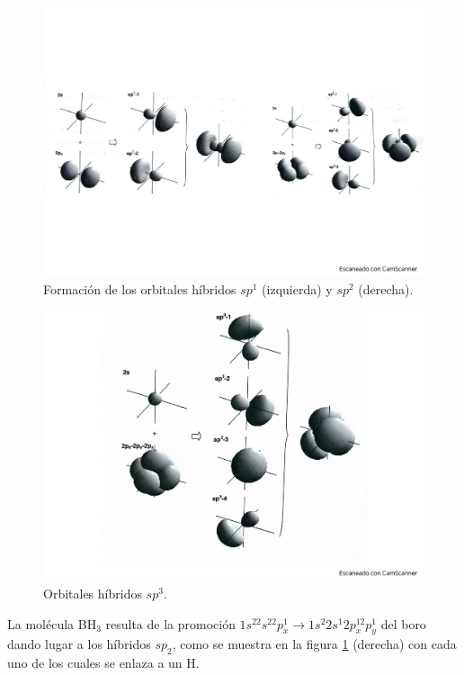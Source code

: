\begin{figure}[h!] \centering
    \includegraphics[scale=0.4]{Cuerpo/Ch_03/Fotos libro 6.pdf}
    \caption{Formación de los orbitales híbridos $sp^1$ (izquierda) y $sp^2$ (derecha).}
    \label{Fig:03-07}
\end{figure}    

\begin{figure}[h!] \centering
    \includegraphics[scale=0.4]{Cuerpo/Ch_03/Fotos libro 7.pdf}
    \caption{Orbitales híbridos $sp^3$.}
    \label{Fig:03-08}
\end{figure}    


La molécula BH$_3$ resulta de la promoción $1s^22s^22p_x^1\rightarrow 1s^2 2s^1 2p_x^12p_y^1$ del boro dando lugar a los híbridos $sp_2$, como se muestra en la figura \ref{Fig:03-07} (derecha) con cada uno de los cuales se enlaza a un H. 

